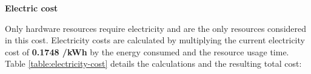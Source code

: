 
\textbf{Electric cost}
\label{sec:electric-cost}
\vspace{-5pt}

Only hardware resources require electricity and are the only resources considered in this cost. Electricity costs are calculated by multiplying the current electricity cost of \textbf{0.1748 \texteuro /kWh} \cite{electricity-price-spain} by the energy consumed and the resource usage time. Table \ref{table:electricity-cost} details the calculations and the resulting total cost: 

\vspace{-5pt}

\begin{table}[H]
    \renewcommand{\arraystretch}{1}
    \centering
    \footnotesize
    \setlength{\tabcolsep}{3.5pt} 
    \normalsize 
    \caption[ Electricity cost]
    {Electricity cost. [Own creation]} 
    \vspace{-1em}
    \label{table:electricity-cost}
\end{table}

\vspace{-10pt}
